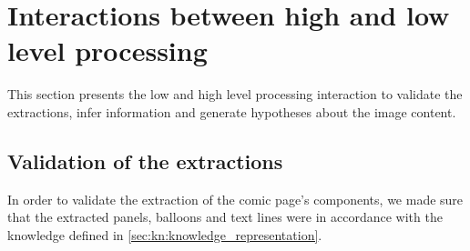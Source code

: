 

\section{Interactions between high and low level processing}
\label{sec:kn:interaction_low_high_level_processing}

This section presents the low and high level processing interaction to validate the extractions, infer information and generate hypotheses about the image content.%
\subsection{Validation of the extractions} %
\label{sub:kn:validation}
In order to validate the extraction of the comic page's components, we made sure that the extracted panels, balloons and text lines were in accordance with the knowledge defined in \ref{sec:kn:knowledge_representation}.

